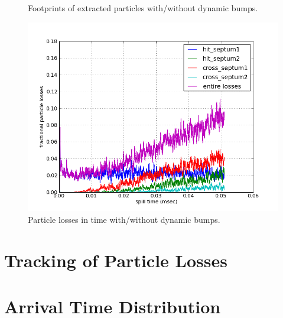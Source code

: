 \documentclass[aps,prstab,onecolumn,preprint,endfloats]{revtex4-1}
\begin{document}
\begin{figure}[!htbp]
  \caption{\label{fig:bump3}Footprints of extracted particles with/without dynamic bumps.}
\end{figure}

\begin{figure}[!htbp]
  \includegraphics[width=.45\textwidth]{img/20140203-06.png}
  \caption{\label{fig:bump4}Particle losses in time with/without dynamic bumps.}
\end{figure}

\clearpage

\section{\label{sec:loss}Tracking of Particle Losses}

\section{\label{sec:arrival}Arrival Time Distribution}
\end{document}

